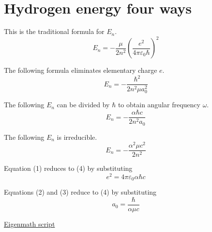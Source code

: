 

\section*{Hydrogen energy four ways}

This is the traditional formula for $E_n$.
\begin{equation*}
E_n=-\frac{\mu}{2n^2}\left(\frac{e^2}{4\pi\varepsilon_0\hbar}\right)^2
\tag{1}
\end{equation*}

The following formula eliminates elementary charge $e$.
\begin{equation*}
E_n=-\frac{\hbar^2}{2n^2\mu a_0^2}
\tag{2}
\end{equation*}

The following $E_n$ can be divided by $\hbar$ to obtain angular frequency $\omega$.
\begin{equation*}
E_n=-\frac{\alpha\hbar c}{2n^2a_0}
\tag{3}
\end{equation*}

The following $E_n$ is irreducible.
\begin{equation*}
E_n=-\frac{\alpha^2\mu c^2}{2n^2}
\tag{4}
\end{equation*}

Equation (1) reduces to (4) by substituting
\begin{equation*}
e^2=4\pi\varepsilon_0\alpha\hbar c
\end{equation*}

Equations (2) and (3) reduce to (4) by substituting
\begin{equation*}
a_0=\frac{\hbar}{\alpha\mu c}
\end{equation*}

\href{https://georgeweigt.github.io/examples/hydrogen-energy-four-ways-demo.html}{Eigenmath script}



